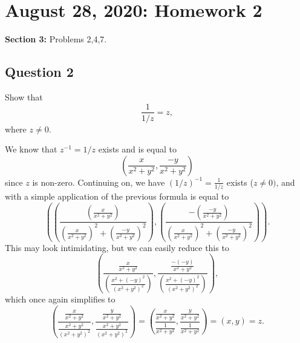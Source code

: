 \section{August 28, 2020: Homework 2}
\textbf{Section 3:} Problems 2,4,7.

\subsection{Question 2}
\begin{prob}
    Show that \[
    \frac{1}{1/z}=z,
    \]
    where $z \neq 0.$
\end{prob}
\begin{solution}
    We know that $z^{-1}=1/z$ exists and is equal to 
    \[
        \left( \frac{x}{x^2+y^2},\frac{-y}{x^2+y^2} \right) 
    \]
    since $z$ is non-zero. Continuing on, we have $(1/z)^{-1}=\frac{1}{1/z}$ exists ($z \neq 0)$, and with a simple application of the previous formula is equal to
    \[
        \left( \left( \frac{\left( \frac{x}{x^2+y^2} \right) }{ \left( \frac{x}{x^2+y^2} \right)^2 + \left( \frac{-y}{x^2+y^2} \right)^2 } \right), \left( \frac{-\left( \frac{-y}{x^2+y^2} \right) }{\left( \frac{x}{x^2+y^2} \right)^2 + \left( \frac{-y}{x^2+y^2} \right) ^2} \right) \right).
    \]  
   This may look intimidating, but we can easily reduce this to 
   \[
       \left( \frac{\frac{x}{x^2+y^2}}{\left( \frac{x^2+(-y)^2}{\left( x^2+y^2 \right) ^2} \right) }, \frac{\frac{-(-y)}{x^2+y^2}}{\left( \frac{x^2+(-y)^2}{\left( x^2+y^2 \right) ^2} \right) } \right),
   \]
   which once again simplifies to
    \[
        \left( \frac{\frac{x}{x^2+y^2}}{\frac{x^2+y^2}{\left( x^2+y^2 \right) ^2}}, \frac{\frac{y}{x^2+y^2}}{\frac{x^2+y^2}{\left( x^2+y^2 \right) ^2}}\right) = \left( \frac{\frac{x}{x^2+y^2}}{\frac{1}{x^2+y^2}}, \frac{\frac{y}{x^2+y^2}}{\frac{1}{x^2+y^2}} \right) = (x,y) = z.
    \]
\end{solution}
    
